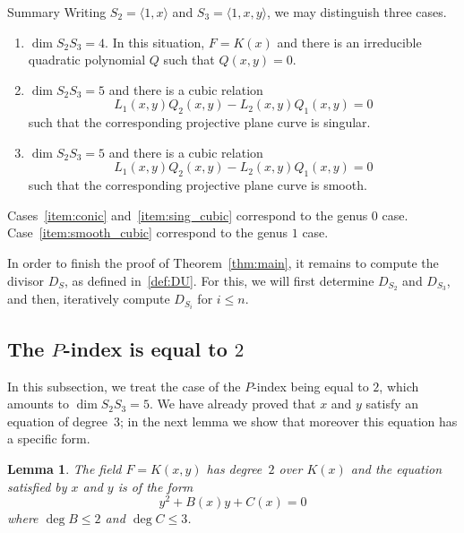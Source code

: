 \documentclass[10pt]{amsart}
\newtheorem{lemm}[theo]{Lemma}
\theoremstyle{definition}
\theoremstyle{remark}
\newenvironment{enonce*}[2][]{\par\medskip\noindent\textbf{#2.}\ }{\par\medskip}
\renewcommand{\leq}{\leqslant}
\begin{document}
\begin{enonce*}[remark]{Summary}
Writing $S_2=\langle 1,x\rangle$ and $S_3=\langle 1,x,y \rangle$, we may distinguish three cases.
\begin{enumerate}
\item\label{item:conic}
$\dim S_2S_3=4$. In this situation, $F=K(x)$ and there is an irreducible quadratic polynomial $Q$ such that $Q(x,y)=0$.
\item\label{item:sing_cubic}
$\dim S_2S_3=5$ and there is a cubic
relation
\[
L_1(x,y) Q_2(x,y) - L_2(x,y) Q_1(x,y)=0
\]
such that the
corresponding projective plane curve is singular.
\item\label{item:smooth_cubic}
$\dim S_2S_3=5$ and there is a cubic
relation
\[
L_1(x,y) Q_2(x,y) - L_2(x,y) Q_1(x,y)=0
\]
such that the
corresponding projective plane curve is smooth.
\end{enumerate}
Cases~\eqref{item:conic} and~\eqref{item:sing_cubic} correspond to the genus $0$ case. Case~\eqref{item:smooth_cubic} correspond to the genus $1$ case.
\end{enonce*}

In order to finish the proof of Theorem~\ref{thm:main}, it remains to compute the divisor $D_S$, as defined in~\ref{def:DU}. For this, we will first determine $D_{S_2}$ and $D_{S_3}$, and then, iteratively compute $D_{S_i}$ for $i\leq n$.

\subsection{The \texorpdfstring{$P$}{P}-index is equal to \texorpdfstring{$2$}{2}}\label{sec:Pindex=2}

In this subsection, we treat the case of the $P$-index being equal to $2$, which amounts to $\dim S_2S_3=5$. We have already proved that $x$ and $y$ satisfy an equation of degree~$3$; in the next lemma we show that moreover this equation has a specific form.

\begin{lemm}\label{lem:deg2}
The field $F= K(x,y)$ has degree~$2$ over $K(x)$ and the equation satisfied by $x$ and $y$ is of the form
\begin{equation}\label{eq:G}
y^2+B(x)y+C(x)=0
\end{equation}
where $\deg B\leq2$ and $\deg C\leq3$.
\end{lemm}
\end{document}
